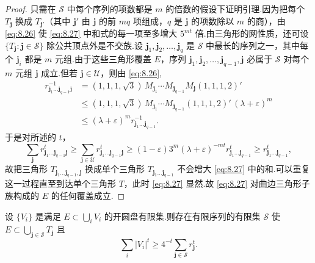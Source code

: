 \begin{proof}
只需在 $\mathcal{S}$ 中每个序列的项数都是 $m$ 的倍数的假设下证明引理.因为把每个 $T_{\mathbf{j}}$ 换成 $T_{\mathbf{j}'}$（其中 $\mathbf{j}'$ 由 $\mathbf{j}$ 的前 $mq$ 项组成，$q$ 是 $\mathbf{j}$ 的项数除以 $m$ 的商），由 \eqref{eq:8.26} 使 \eqref{eq:8.27} 中和式的每一项至多增大 $5^{mt}$ 倍.由三角形的网性质，还可设 $\{T_{\mathbf{j}}:\mathbf{j}\in\mathcal{S}\}$ 除公共顶点外是不交族.设 $\mathbf{j}_1,\mathbf{j}_2,\ldots,\mathbf{j}_q$ 是 $\mathcal{S}$ 中最长的序列之一，其中每个 $\mathbf{j}_i$ 都是 $m$ 元组.由于这些三角形覆盖 $E$，序列 $\mathbf{j}_1,\mathbf{j}_2,\ldots,\mathbf{j}_{q-1},\mathbf{j}$ 必属于 $\mathcal{S}$ 对每个 $m$ 元组 $\mathbf{j}$ 成立.但若 $\mathbf{j}\in\mathcal{U}$，则由 \eqref{eq:8.26},
\begin{align*}
  r_{\mathbf{j}_1\ldots\mathbf{j}_{q-1}\mathbf{j}}^{-1}
  &=(1,1,1,\sqrt{3})\,M_{\mathbf{j}_1}\cdots M_{\mathbf{j}_{q-1}}M_{\mathbf{j}}(1,1,1,2)'\\
  &\leq(1,1,1,\sqrt{3})\,M_{\mathbf{j}_1}\cdots M_{\mathbf{j}_{q-1}}(1,1,1,2)'\,(\lambda+\varepsilon)^{m}\\
  &\leq(\lambda+\varepsilon)^{m}r_{\mathbf{j}_1\ldots\mathbf{j}_{q-1}}^{-1}.
\end{align*}
于是对所述的 $t$，
\[
  \sum_{\mathbf{j}}r_{\mathbf{j}_1\ldots\mathbf{j}_{q-1}\mathbf{j}}^{t}
  \geq\sum_{\mathbf{j}\in\mathcal{U}}r_{\mathbf{j}_1\ldots\mathbf{j}_{q-1}\mathbf{j}}^{t}
  \geq(1-\varepsilon)3^{m}(\lambda+\varepsilon)^{-mt}r_{\mathbf{j}_1\ldots\mathbf{j}_{q-1}}^{t}
  \geq r_{\mathbf{j}_1\ldots\mathbf{j}_{q-1}}^{t},
\]
故把三角形 $T_{\mathbf{j}_1\ldots\mathbf{j}_{q-1},\mathbf{j}}$ 换成单个三角形 $T_{\mathbf{j}_1\ldots\mathbf{j}_{q-1}}$ 不会增大 \eqref{eq:8.27} 中的和.可以重复这一过程直至到达单个三角形 $T$，此时 \eqref{eq:8.27} 显然.故 \eqref{eq:8.27} 对曲边三角形子族构成的 $E$ 的任何覆盖成立.
\end{proof}

\begin{lemma}\label{lem:8.13}
设 $\{V_i\}$ 是满足 $E\subset\bigcup_i V_i$ 的开圆盘有限集.则存在有限序列的有限集 $\mathcal{S}$ 使 $E\subset\bigcup_{\mathbf{j}\in\mathcal{S}}T_{\mathbf{j}}$ 且
\begin{equation}\label{eq:8.28}
  \sum_{i}|V_i|^{t}\geq 4^{-t}\sum_{\mathbf{j}\in\mathcal{S}}r_{\mathbf{j}}^{t}.
\end{equation}
\end{lemma}

